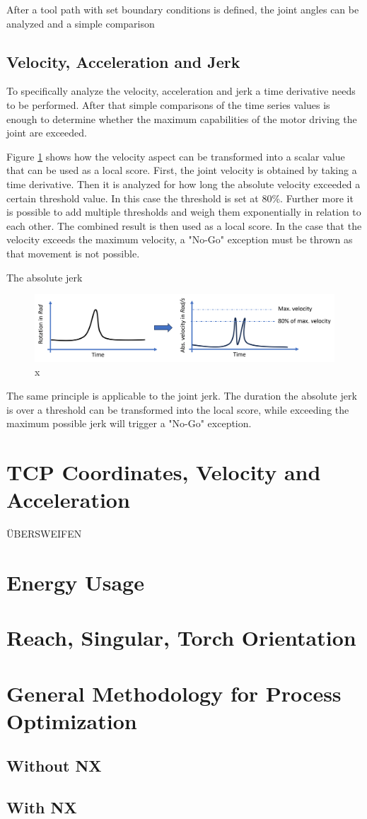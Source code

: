After a tool path with set boundary conditions is defined, the joint angles can be analyzed and a simple comparison  

\subsection{Velocity, Acceleration and Jerk}


To specifically analyze the velocity, acceleration and jerk a time derivative needs to be performed. After that simple comparisons of the time series values is enough to determine whether 
the maximum capabilities of the motor driving the joint are exceeded.


Figure \ref{velo} shows how the velocity aspect can be transformed into a scalar value that can be used as a local score. First, the joint velocity is obtained by taking a time derivative. Then it is analyzed for how long the absolute velocity exceeded a certain threshold value. In this case the threshold is set at 80\%. Further more it is possible to add multiple thresholds and weigh them exponentially in relation to each other. The combined result is then used as a local score. In the case that the velocity exceeds the maximum velocity, a "No-Go" exception must be thrown as that movement is not possible.

The absolute jerk 
\begin{figure}[H]
	\centerline{\includegraphics[width=1\textwidth]{figures/veloy.png}}
	\caption{x}
	\label{velo}
\end{figure}

The same principle is applicable to the joint jerk. The duration the absolute jerk is over a threshold can be transformed into the local score, while exceeding the maximum possible jerk will trigger a "No-Go" exception.



\section{TCP Coordinates, Velocity and Acceleration}
ÜBERSWEIFEN
\section{Energy Usage}
\section{Reach, Singular, Torch Orientation}
\section{General Methodology for Process Optimization}
\subsection{Without NX}
\subsection{With NX}